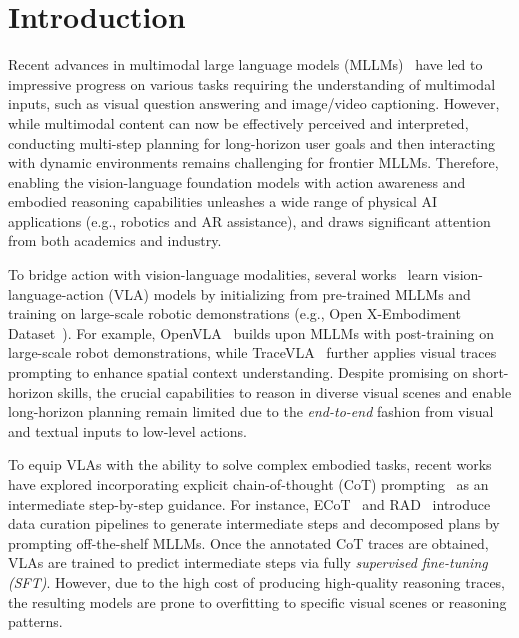 \section{Introduction}
\label{sec:intro}

Recent advances in multimodal large language models (MLLMs)~\cite{team2024gemini,liu2023visual,bai2025qwen2,shi2024eagle,lin2024vila,achiam2023gpt,li2024llava,chen2024expanding,liu2024nvila,zhu2025internvl3,li2025eagle,chen2025eagle} have led to impressive progress on various tasks requiring the understanding of multimodal inputs, such as visual question answering and image/video captioning. However, while multimodal content can now be effectively perceived and interpreted, conducting multi-step planning for long-horizon user goals and then interacting with dynamic environments remains challenging for frontier MLLMs. Therefore, enabling the vision-language foundation models with action awareness and embodied reasoning capabilities unleashes a wide range of physical AI applications (e.g., robotics and AR assistance), and draws significant attention from both academics and industry.    

To bridge action with vision-language modalities, several works~\cite{brohan2023rt,kim24openvla,zheng2024tracevla,bjorck2025gr00t,team2024octo} learn vision-language-action (VLA) models by initializing from pre-trained MLLMs and training on large-scale robotic demonstrations (e.g., Open X-Embodiment Dataset~\cite{o2024open}). For example, OpenVLA~\cite{kim24openvla} builds upon MLLMs with post-training on large-scale robot demonstrations, while TraceVLA~\cite{zheng2024tracevla} further applies visual traces prompting to enhance spatial context understanding. Despite promising on short-horizon skills, the crucial capabilities to reason in diverse visual scenes and enable long-horizon planning remain limited due to the \textit{end-to-end} fashion from visual and textual inputs to low-level actions. 




To equip VLAs with the ability to solve complex embodied tasks, recent works~\cite{zawalski2024robotic,clark2025action,zhao2025cot,shi2025hi} have explored incorporating explicit chain-of-thought (CoT) prompting~\cite{wei2022chain} as an intermediate step-by-step guidance. For instance, ECoT~\cite{zawalski2024robotic} and RAD~\cite{clark2025action} introduce data curation pipelines to generate intermediate steps and decomposed plans by prompting off-the-shelf MLLMs. Once the annotated CoT traces are obtained, VLAs are trained to predict intermediate steps via fully \textit{supervised fine-tuning (SFT)}. However, due to the high cost of producing high-quality reasoning traces, the resulting models are prone to overfitting to specific visual scenes or reasoning patterns.


